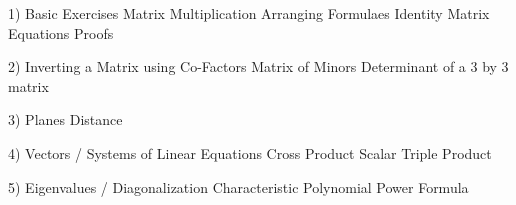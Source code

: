 1) Basic Exercises
	Matrix Multiplication
	Arranging Formulaes
	Identity Matrix Equations
	Proofs

2) Inverting a Matrix using Co-Factors
	Matrix of Minors
	Determinant of a 3 by 3 matrix

3) Planes
	Distance

4) Vectors / Systems of Linear Equations
	Cross Product
	Scalar Triple Product


5) Eigenvalues / Diagonalization
	Characteristic Polynomial
	Power Formula

